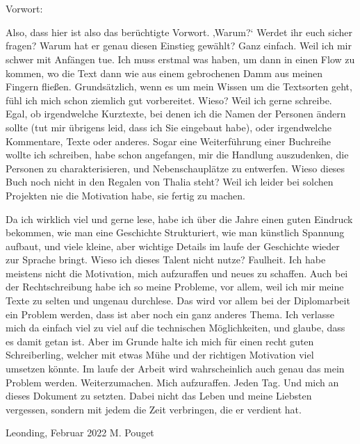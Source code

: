 \thispagestyle{empty}
\vspace{3cm}
~ \\ \\

Vorwort: 

 

Also, dass hier ist also das berüchtigte Vorwort. ‚Warum?‘ Werdet ihr euch sicher fragen? Warum hat er genau diesen Einstieg gewählt? Ganz einfach. Weil ich mir schwer mit Anfängen tue. Ich muss erstmal was haben, um dann in einen Flow zu kommen, wo die Text dann wie aus einem gebrochenen Damm aus meinen Fingern fließen. Grundsätzlich, wenn es um mein Wissen um die Textsorten geht, fühl ich mich schon ziemlich gut vorbereitet. Wieso? Weil ich gerne schreibe. Egal, ob irgendwelche Kurztexte, bei denen ich die Namen der Personen ändern sollte (tut mir übrigens leid, dass ich Sie eingebaut habe), oder irgendwelche Kommentare, Texte oder anderes. Sogar eine Weiterführung einer Buchreihe wollte ich schreiben, habe schon angefangen, mir die Handlung auszudenken, die Personen zu charakterisieren, und Nebenschauplätze zu entwerfen. Wieso dieses Buch noch nicht in den Regalen von Thalia steht? Weil ich leider bei solchen Projekten nie die Motivation habe, sie fertig zu machen.  

Da ich wirklich viel und gerne lese, habe ich über die Jahre einen guten Eindruck bekommen, wie man eine Geschichte Strukturiert, wie man künstlich Spannung aufbaut, und viele kleine, aber wichtige Details im laufe der Geschichte wieder zur Sprache bringt. Wieso ich dieses Talent nicht nutze? Faulheit. Ich habe meistens nicht die Motivation, mich aufzuraffen und neues zu schaffen. Auch bei der Rechtschreibung habe ich so meine Probleme, vor allem, weil ich mir meine Texte zu selten und ungenau durchlese. Das wird vor allem bei der Diplomarbeit ein Problem werden, dass ist aber noch ein ganz anderes Thema. Ich verlasse mich da einfach viel zu viel auf die technischen Möglichkeiten, und glaube, dass es damit getan ist. Aber im Grunde halte ich mich für einen recht guten Schreiberling, welcher mit etwas Mühe und der richtigen Motivation viel umsetzen könnte. Im laufe der Arbeit wird wahrscheinlich auch genau das mein Problem werden. Weiterzumachen. Mich aufzuraffen. Jeden Tag. Und mich an dieses Dokument zu setzten. Dabei nicht das Leben und meine Liebsten vergessen, sondern mit jedem die Zeit verbringen, die er verdient hat. 

\begin{tabbing}
Leonding, Februar 2022 \hspace{5cm} M. Pouget
\end{tabbing}
\vspace{10cm}
\newpage
\setcounter{page}{1}
